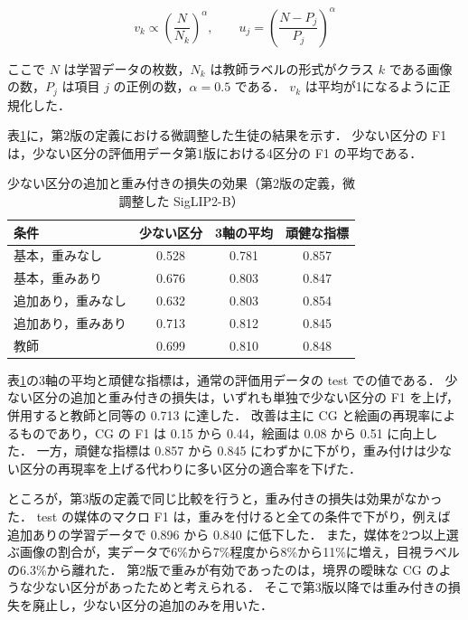 \begin{equation}
    v_k \propto \left( \frac{N}{N_k} \right)^{\alpha},
    \qquad
    u_j = \left( \frac{N - P_j}{P_j} \right)^{\alpha}
    \label{eq_weight}
\end{equation}

\noindent
ここで $ N $ は学習データの枚数，$ N_k $ は教師ラベルの形式がクラス $ k $ である画像の数，$ P_j $ は項目 $ j $ の正例の数，$ \alpha = 0.5 $ である．
$ v_k $ は平均が1になるように正規化した．

表\ref{tab_rare_weight}に，第2版の定義における微調整した生徒の結果を示す．
少ない区分の F1 は，少ない区分の評価用データ第1版における4区分の F1 の平均である．

\begin{table}[t]
    \centering
    \caption{少ない区分の追加と重み付きの損失の効果（第2版の定義，微調整した SigLIP2-B）}
    \label{tab_rare_weight}
    \small
    \begin{tabular}{lccc}
        \toprule
        条件 & 少ない区分 & 3軸の平均 & 頑健な指標 \\
        \midrule
        基本，重みなし & 0.528 & 0.781 & 0.857 \\
        基本，重みあり & 0.676 & 0.803 & 0.847 \\
        追加あり，重みなし & 0.632 & 0.803 & 0.854 \\
        追加あり，重みあり & 0.713 & 0.812 & 0.845 \\
        \midrule
        教師 & 0.699 & 0.810 & 0.848 \\
        \bottomrule
    \end{tabular}
\end{table}

表\ref{tab_rare_weight}の3軸の平均と頑健な指標は，通常の評価用データの test での値である．
少ない区分の追加と重み付きの損失は，いずれも単独で少ない区分の F1 を上げ，併用すると教師と同等の 0.713 に達した．
改善は主に CG と絵画の再現率によるものであり，CG の F1 は 0.15 から 0.44，絵画は 0.08 から 0.51 に向上した．
一方，頑健な指標は 0.857 から 0.845 にわずかに下がり，重み付けは少ない区分の再現率を上げる代わりに多い区分の適合率を下げた．

ところが，第3版の定義で同じ比較を行うと，重み付きの損失は効果がなかった．
test の媒体のマクロ F1 は，重みを付けると全ての条件で下がり，例えば追加ありの学習データで 0.896 から 0.840 に低下した．
また，媒体を2つ以上選ぶ画像の割合が，実データで6\%から7\%程度から8\%から11\%に増え，目視ラベルの6.3\%から離れた．
第2版で重みが有効であったのは，境界の曖昧な CG のような少ない区分があったためと考えられる．
そこで第3版以降では重み付きの損失を廃止し，少ない区分の追加のみを用いた．

